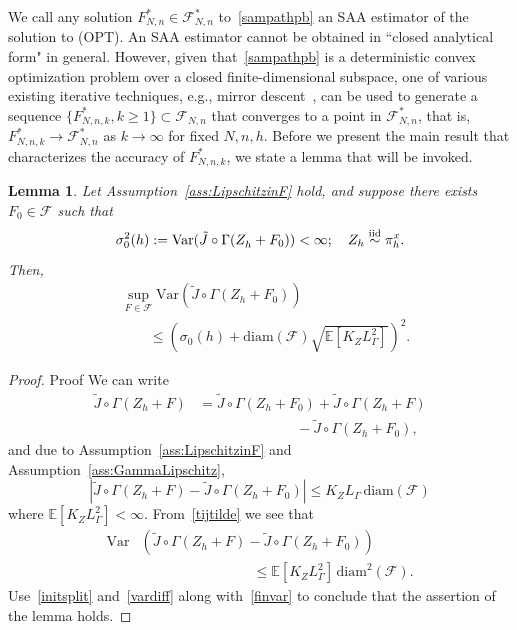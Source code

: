 \documentclass[11pt,leqno]{amsart}
\newtheorem{lemma}{Lemma}
\begin{document}
 We call any solution $F_{N,n}^* \in \mathcal{F}^*_{N,n}$ to~\eqref{sampathpb} an SAA estimator of the solution to (OPT). An SAA estimator cannot be obtained in ``closed analytical form" in general. However, given that~\eqref{sampathpb} is a deterministic convex optimization problem over a closed finite-dimensional subspace, one of various existing iterative techniques, e.g., mirror descent~\citep{2015bub}, can be used to generate a sequence $\{F_{N,n,k}^*, k \geq 1\} \subset \mathcal{F}_{N,n}$ that converges to a point in $\mathcal{F}_{N,n}^*$, that is, $F_{N,n,k}^* \to \mathcal{F}_{N,n}^*$ as $k \to \infty$ for fixed $N,n,h$.  Before we present the main result that characterizes the accuracy of $F^*_{N,n,k}$, we state a lemma that will be invoked. 

\begin{lemma}\label{lem:supvarbd} Let Assumption~\ref{ass:LipschitzinF} hold, and suppose there exists $F_0 \in \mathcal{F}$ such that \begin{equation}\label{finvar} \sigma_0^2(h) := \mbox{Var}(\tilde{J}\circ \Gamma(Z^{}_{h} + F_0)) < \infty; \quad Z_{h} \overset{\mbox{\scriptsize iid}}{\sim} \pi^{x}_{h}.\end{equation} Then, 
\begin{equation} \label{varbd} 
\begin{aligned}
&\sup_{F \in \mathcal{F}} \mbox{Var}(\tilde{J}\circ \Gamma(Z^{}_{h} + F_0))\\
&\qquad\leq \left(\sigma_0(h) + \mbox{diam}(\mathcal{F})\sqrt{\mathbb{E}[K_{Z} L_\Gamma^2]} \right)^2.   
\end{aligned}
\end{equation} 
\end{lemma}
\begin{proof}{Proof}  We can write \begin{align}\label{initsplit}\tilde{J}\circ \Gamma(Z^{}_{h} + F) &= \tilde{J}\circ \Gamma(Z^{}_{h} + F_0) + \tilde{J}\circ \Gamma(Z^{}_{h} + F)\\\nonumber &\qquad\qquad\qquad\quad - \tilde{J}\circ\Gamma(Z^{}_{h} + F_0),\end{align} and due to Assumption~\ref{ass:LipschitzinF} and Assumption~\ref{ass:GammaLipschitz},  \begin{equation}\label{tijtilde}\left|\tilde{J}\circ\Gamma(Z^{}_{h} + F) - \tilde{J}\circ\Gamma(Z^{}_{h} + F_0)\right| \leq K_{Z} L_\Gamma\, \mbox{diam}(\mathcal{F})\end{equation}
where $\mathbb{E}[K_{Z} L_\Gamma^2]<\infty.$ From~\eqref{tijtilde} we see that \begin{align}\label{vardiff}\mbox{Var}&(\tilde{J}\circ\Gamma(Z^{}_{h} + F) - \tilde{J}\circ\Gamma(Z^{}_{h} + F_0)) \\\nonumber &\qquad\qquad\qquad\qquad \leq \mathbb{E}\left[ K_{Z} L_\Gamma^2 \right]  \, \mbox{diam}^2(\mathcal{F}).\end{align} Use~\eqref{initsplit} and~\eqref{vardiff} along with~\eqref{finvar} to conclude that the assertion of the lemma holds. \end{proof}
\end{document}
